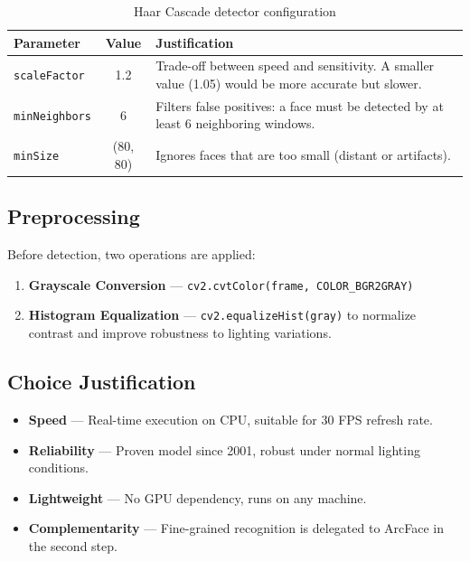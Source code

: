 \begin{table}[H]
    \centering
    \begin{tabular}{lcp{7cm}}
        \toprule
        \textbf{Parameter} & \textbf{Value} & \textbf{Justification} \\
        \midrule
        \texttt{scaleFactor}  & 1.2      & Trade-off between speed and sensitivity. A smaller value (1.05) would be more accurate but slower. \\
        \texttt{minNeighbors} & 6        & Filters false positives: a face must be detected by at least 6 neighboring windows. \\
        \texttt{minSize}      & (80, 80) & Ignores faces that are too small (distant or artifacts). \\
        \bottomrule
    \end{tabular}
    \caption{Haar Cascade detector configuration}
\end{table}

\subsection{Preprocessing}

Before detection, two operations are applied:
\begin{enumerate}
    \item \textbf{Grayscale Conversion} — \texttt{cv2.cvtColor(frame, COLOR\_BGR2GRAY)}
    \item \textbf{Histogram Equalization} — \texttt{cv2.equalizeHist(gray)} to normalize contrast and improve robustness to lighting variations.
\end{enumerate}

\subsection{Choice Justification}

\begin{successbox}
\begin{itemize}[nosep]
    \item \textbf{Speed} — Real-time execution on CPU, suitable for 30 FPS refresh rate.
    \item \textbf{Reliability} — Proven model since 2001, robust under normal lighting conditions.
    \item \textbf{Lightweight} — No GPU dependency, runs on any machine.
    \item \textbf{Complementarity} — Fine-grained recognition is delegated to ArcFace in the second step.
\end{itemize}
\end{successbox}

